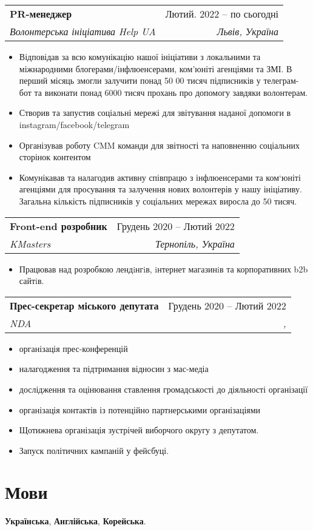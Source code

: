 \documentclass[letterpaper,11pt]{article}
\makeatletter
\newcommand{\resumeItem}[1]{
  \item\small{
    {#1 \vspace{-2pt}}
  }
}
\newcommand{\resumeSubheading}[4]{
  \vspace{-2pt}\item
    \begin{tabular*}{0.97\textwidth}[t]{l@{\extracolsep{\fill}}r}
      \textbf{#1} & #2 \\
      \textit{\small#3} & \textit{\small #4} \\
    \end{tabular*}\vspace{-7pt}
}
\newcommand{\resumeItemListStart}{\begin{itemize}}
\newcommand{\resumeItemListEnd}{\end{itemize}\vspace{-5pt}}
\makeatother
\begin{document}
          \resumeSubheading
      {PR-менеджер}{Лютий. 2022 -- по сьогодні}
      {Волонтерська ініціатива Help UA}{Львів, Україна}
      \resumeItemListStart
       \resumeItem{Відповідав за всю комунікацію нашої ініціативи з локальними та міжнародними блогерами/інфлюенсерами, ком'юніті агенціями та ЗМІ. В перший місяць змогли залучити понад 50 00 тисяч підписників у телеграм-бот та виконати понад 6000 тисяч прохань про допомогу завдяки волонтерам. }
        \resumeItem{Створив та запустив соціальні мережі для звітування наданої допомоги в instagram/facebook/telegram }
        \resumeItem{Організував роботу CMM команди для звітності та наповненню соціальних сторінок контентом}
        \resumeItem{Комунікавав та налагодив активну співпрацю з інфлюенсерами та ком`юніті агенціями для просування та залучення нових волонтерів у нашу ініціативу. Загальна кількість підписників у соціальних мережах виросла до
        50 тисяч.}
    \resumeItemListEnd

    \resumeSubheading
      {Front-end розробник}{Грудень 2020 -- Лютий 2022}
      {KMasters}{Тернопіль, Україна}
      \resumeItemListStart
        \resumeItem{Працював над розробкою лендiнгiв, iнтернет магазинiв та корпоративних b2b сайтiв.}
      \resumeItemListEnd
      



 \resumeSubheading
      {Прес-секретар міського депутата}{Грудень 2020 -- Лютий 2022}
      {NDA}{,}
      \resumeItemListStart
        \resumeItem{організація прес-конференцій}
        \resumeItem{налагодження та підтримання відносин з мас-медіа}
        \resumeItem{дослідження та оцінювання ставлення громадськості до діяльності організації}
        \resumeItem{організація контактів із потенційно партнерськими організаціями}
        \resumeItem{Щотижнева організація зустрічей виборчого округу з депутатом.}
        \resumeItem{Запуск політичних кампаній у фейсбуці.}

      \resumeItemListEnd
    


 
\section{Мови}
 \begin{itemize}[leftmargin=0.15in, label={}]
    \small{\item{
     \textbf{Українська}{,} 
     \textbf{Англійська}{,} 
     \textbf{Корейська}{.} 
     
    }}
 \end{itemize}

\end{document}
